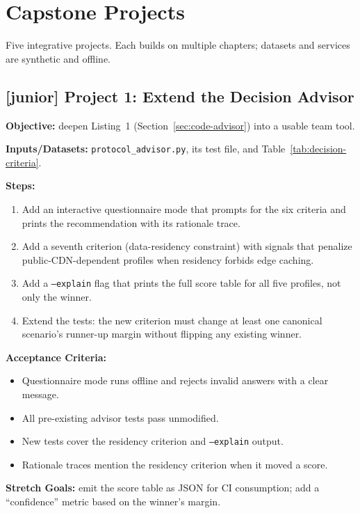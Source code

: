 \section{Capstone Projects}
\label{sec:capstones}

Five integrative projects. Each builds on multiple chapters; datasets and
services are synthetic and offline.

\subsection{[junior] Project 1: Extend the Decision Advisor}

\textbf{Objective:} deepen Listing~1 (Section~\ref{sec:code-advisor}) into a usable team
tool.

\textbf{Inputs/Datasets:} \texttt{protocol\_advisor.py}, its test file, and
Table~\ref{tab:decision-criteria}.

\textbf{Steps:}
\begin{enumerate}
  \item Add an interactive questionnaire mode that prompts for the six
        criteria and prints the recommendation with its rationale trace.
  \item Add a seventh criterion (data-residency constraint) with signals
        that penalize public-CDN-dependent profiles when residency forbids
        edge caching.
  \item Add a \texttt{--explain} flag that prints the full score table for
        all five profiles, not only the winner.
  \item Extend the tests: the new criterion must change at least one
        canonical scenario's runner-up margin without flipping any existing
        winner.
\end{enumerate}

\textbf{Acceptance Criteria:}
\begin{itemize}
  \item[$\square$] Questionnaire mode runs offline and rejects invalid
        answers with a clear message.
  \item[$\square$] All pre-existing advisor tests pass unmodified.
  \item[$\square$] New tests cover the residency criterion and
        \texttt{--explain} output.
  \item[$\square$] Rationale traces mention the residency criterion when it
        moved a score.
\end{itemize}

\textbf{Stretch Goals:} emit the score table as JSON for CI consumption;
add a ``confidence'' metric based on the winner's margin.

